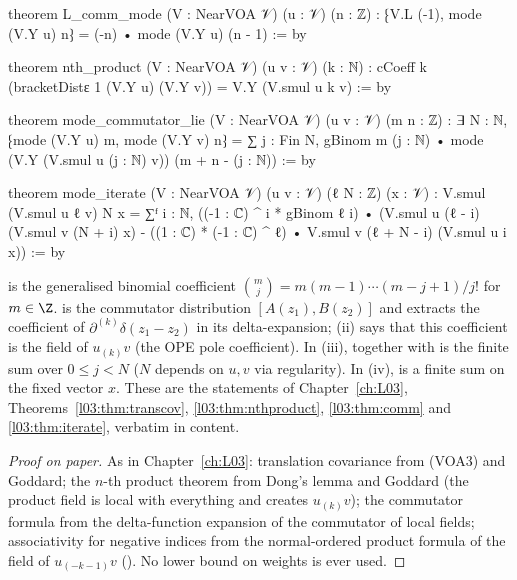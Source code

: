 \begin{leancode}
theorem L_comm_mode (V : NearVOA 𝒱) (u : 𝒱) (n : ℤ) :
    ⁅V.L (-1), mode (V.Y u) n⁆ = (-n) • mode (V.Y u) (n - 1) := by

theorem nth_product (V : NearVOA 𝒱) (u v : 𝒱) (k : ℕ) :
    cCoeff k (bracketDistε 1 (V.Y u) (V.Y v)) = V.Y (V.smul u k v) := by

theorem mode_commutator_lie (V : NearVOA 𝒱) (u v : 𝒱) (m n : ℤ) :
    ∃ N : ℕ, ⁅mode (V.Y u) m, mode (V.Y v) n⁆ =
      ∑ j : Fin N, gBinom m (j : ℕ) •
        mode (V.Y (V.smul u (j : ℕ) v)) (m + n - (j : ℕ)) := by

theorem mode_iterate (V : NearVOA 𝒱) (u v : 𝒱) (ℓ N : ℤ) (x : 𝒱) :
    V.smul (V.smul u ℓ v) N x
      = ∑ᶠ i : ℕ, ((-1 : ℂ) ^ i * gBinom ℓ i) •
          (V.smul u (ℓ - i) (V.smul v (N + i) x)
            - ((1 : ℂ) * (-1 : ℂ) ^ ℓ) • V.smul v (ℓ + N - i) (V.smul u i x)) := by
\end{leancode}

\begin{dictionary}
 is the generalised binomial coefficient $\binom mj=m(m-1)\cdots(m-j+1)/j!$ for $m\in\Z$.
 is the commutator distribution $[A(z_1),B(z_2)]$ and  extracts the coefficient of
$\partial^{(k)}\delta(z_1-z_2)$ in its delta-expansion; (ii) says that this coefficient is the field of $u_{(k)}v$ (the OPE pole
coefficient).  In (iii),  together with  is the finite sum over $0\le j<N$ ($N$ depends on
$u,v$ via regularity).  In (iv),  is a finite sum on the fixed vector $x$.  These are the statements of
Chapter~\ref{ch:L03}, Theorems~\ref{l03:thm:transcov}, \ref{l03:thm:nthproduct}, \ref{l03:thm:comm} and
\ref{l03:thm:iterate}, verbatim in content.
\end{dictionary}

\begin{proof}[Proof on paper]
As in Chapter~\ref{ch:L03}: translation covariance from (VOA3) and Goddard; the $n$-th product theorem from Dong's lemma
and Goddard (the product field is local with everything and creates $u_{(k)}v$); the commutator formula from the
delta-function expansion of the commutator of local fields; associativity for negative indices from the normal-ordered
product formula of the field of $u_{(-k-1)}v$ ().  No lower bound on weights is ever used.
\end{proof}

